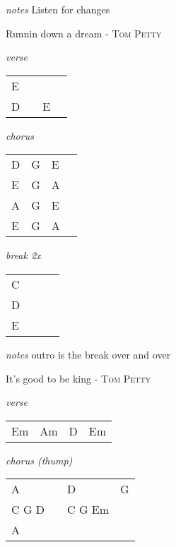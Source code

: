 \documentclass[12pt]{article}
\begin{document}
\textit{notes}
Listen for changes
\newpage

{\Huge Runnin down a dream} {\huge - \textsc{Tom Petty}}

\huge
\textit{verse}

\begin{tabular}{|P{1.25in}|P{1.25in}|P{1.25in}|P{1.25in}|}
  E  &   &   &   \\
  D  &   &  E &   \\
\end{tabular}

\textit{chorus}

\begin{tabular}{|P{1.25in}|P{1.25in}|P{1.25in}|P{1.25in}|}
   D & G  & E  &   \\
   E  &  G  & A  &  \\
   A  &  G  & E  &  \\
   E  &  G  & A  &  \\

\end{tabular}

\textit{break 2x}

\begin{tabular}{|P{1.25in}|P{1.25in}|P{1.25in}|P{1.25in}|}
  C  &   &   &   \\
  D  &   &   &   \\
  E  &   &   &   \\
\end{tabular}

\textit{notes}
outro is the break over and over
\newpage

{\Huge It's good to be king} {\huge - \textsc{Tom Petty}}

\huge
\textit{verse}

\begin{tabular}{|P{1.25in}|P{1.25in}|P{1.25in}|P{1.25in}|}
  Em  & Am  &  D &  Em \\
\end{tabular}

\textit{chorus (thump)}

\begin{tabular}{|P{1.25in}|P{1.25in}|P{1.25in}|P{1.25in}|}
  A  &   &  D &  G \\
  C G D &  &  C G Em & \\
  A  &   &    &    \\
\end{tabular}
\end{document}
